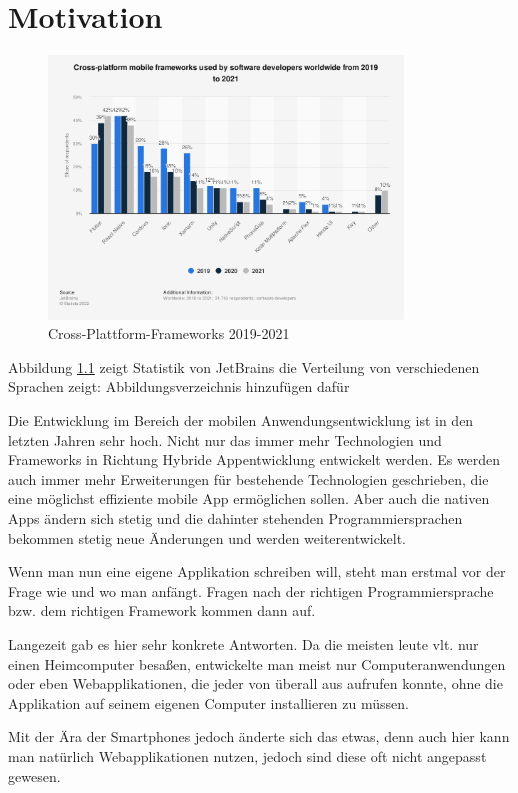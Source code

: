 \chapter{Motivation}


\begin{figure}[ht]
  \centering
  \includegraphics[height=7cm,keepaspectratio]{images/cross-platform-mobile-frameworks.png} 
  \caption{Cross-Plattform-Frameworks 2019-2021}
  \label{fig:statista_cross_plattform}
\end{figure}

Abbildung \ref{fig:statista_cross_plattform} zeigt Statistik von JetBrains die Verteilung von verschiedenen Sprachen zeigt: Abbildungsverzeichnis hinzufügen dafür

Die Entwicklung im Bereich der mobilen Anwendungsentwicklung ist in den letzten Jahren sehr hoch. Nicht nur das immer mehr Technologien und Frameworks in Richtung Hybride Appentwicklung entwickelt werden. Es werden auch immer mehr Erweiterungen für bestehende Technologien geschrieben, die eine möglichst effiziente mobile App ermöglichen sollen. Aber auch die nativen Apps ändern sich stetig und die dahinter stehenden Programmiersprachen bekommen stetig neue Änderungen und werden weiterentwickelt.

Wenn man nun eine eigene Applikation schreiben will, steht man erstmal vor der Frage wie und wo man anfängt.
Fragen nach der richtigen Programmiersprache bzw. dem richtigen Framework kommen dann auf.

Langezeit gab es hier sehr konkrete Antworten. Da die meisten leute vlt. nur einen Heimcomputer besaßen, entwickelte man meist nur Computeranwendungen oder eben Webapplikationen, die jeder von überall aus aufrufen konnte, ohne die Applikation auf seinem eigenen Computer installieren zu müssen.

Mit der Ära der Smartphones jedoch änderte sich das etwas, denn auch hier kann man natürlich Webapplikationen nutzen, jedoch sind diese oft nicht angepasst gewesen.

